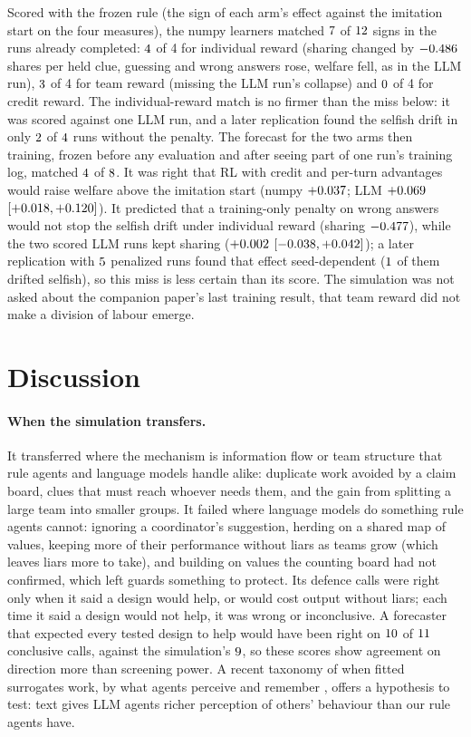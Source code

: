 \documentclass{article}
\begin{document}
Scored with the frozen rule (the sign of each arm's effect against the imitation start on the four measures), the numpy learners matched $7$ of $12$ signs in the runs already completed: $4$ of 4 for individual reward (sharing changed by $-0.486$ shares per held clue, guessing and wrong answers rose, welfare fell, as in the LLM run), $3$ of 4 for team reward (missing the LLM run's collapse) and $0$ of 4 for credit reward. The individual-reward match is no firmer than the miss below: it was scored against one LLM run, and a later replication found the selfish drift in only $2$ of $4$ runs without the penalty. The forecast for the two arms then training, frozen before any evaluation and after seeing part of one run's training log, matched $4$ of $8$. It was right that RL with credit and per-turn advantages would raise welfare above the imitation start (numpy $+0.037$; LLM $+0.069$ $[+0.018, +0.120]$). It predicted that a training-only penalty on wrong answers would not stop the selfish drift under individual reward (sharing $-0.477$), while the two scored LLM runs kept sharing ($+0.002$ $[-0.038, +0.042]$); a later replication with $5$ penalized runs found that effect seed-dependent ($1$ of them drifted selfish), so this miss is less certain than its score. The simulation was not asked about the companion paper's last training result, that team reward did not make a division of labour emerge.

\section{Discussion}

\paragraph{When the simulation transfers.} It transferred where the mechanism is information flow or team structure that rule agents and language models handle alike: duplicate work avoided by a claim board, clues that must reach whoever needs them, and the gain from splitting a large team into smaller groups. It failed where language models do something rule agents cannot: ignoring a coordinator's suggestion, herding on a shared map of values, keeping more of their performance without liars as teams grow (which leaves liars more to take), and building on values the counting board had not confirmed, which left guards something to protect. Its defence calls were right only when it said a design would help, or would cost output without liars; each time it said a design would not help, it was wrong or inconclusive. A forecaster that expected every tested design to help would have been right on $10$ of $11$ conclusive calls, against the simulation's $9$, so these scores show agreement on direction more than screening power. A recent taxonomy of when fitted surrogates work, by what agents perceive and remember \citep{itkin2026poorman}, offers a hypothesis to test: text gives LLM agents richer perception of others' behaviour than our rule agents have.
\end{document}
